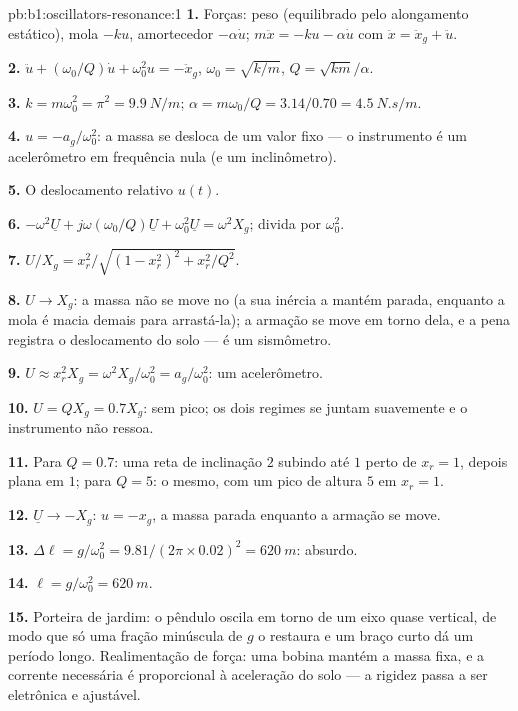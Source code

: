 \begin{solution}{pb:b1:oscillators-resonance:1}
\textbf{1.} Forças: peso (equilibrado pelo alongamento estático), mola
$-ku$, amortecedor $-\alpha\dot u$; $m\ddot x = -ku - \alpha\dot u$ com $\ddot x =
\ddot x_g + \ddot u$.

\textbf{2.} $\ddot u + (\omega_0/Q)\dot u + \omega_0^2u = -\ddot x_g$, $\omega_0 =
\sqrt{k/m}$, $Q = \sqrt{km}/\alpha$.

\textbf{3.} $k = m\omega_0^2 = \pi^2 = \qty{9.9}{N/m}$; $\alpha = m\omega_0/Q =
3.14/0.70 = \qty{4.5}{N.s/m}$.

\textbf{4.} $u = -a_g/\omega_0^2$: a massa se desloca de um valor fixo --- o
instrumento é um acelerômetro em frequência nula (e um inclinômetro).

\textbf{5.} O deslocamento relativo $u(t)$.

\textbf{6.} $-\omega^2\underline U + j\omega(\omega_0/Q)\underline U + \omega_0^2\underline U
= \omega^2X_g$; divida por $\omega_0^2$.

\textbf{7.} $U/X_g = x_r^2/\sqrt{(1 - x_r^2)^2 + x_r^2/Q^2}$.

\textbf{8.} $U \to X_g$: a massa não se move no 
(a sua inércia a mantém parada, enquanto a mola é macia demais para arrastá-la);
a armação se move em torno dela, e a pena registra o deslocamento do solo
--- é um sismômetro.

\textbf{9.} $U \approx x_r^2X_g = \omega^2X_g/\omega_0^2 = a_g/\omega_0^2$: um
acelerômetro.

\textbf{10.} $U = QX_g = 0.7X_g$: sem pico; os dois regimes se juntam suavemente
e o instrumento não ressoa.

\textbf{11.} Para $Q = 0.7$: uma reta de inclinação $2$ subindo até $1$ perto de
$x_r = 1$, depois plana em $1$; para $Q = 5$: o mesmo, com um pico de altura
$5$ em $x_r = 1$.

\textbf{12.} $\underline U \to -X_g$: $u = -x_g$, a massa parada enquanto a
armação se move.

\textbf{13.} $\Delta\ell = g/\omega_0^2 = 9.81/(2\pi \times 0.02)^2 = \qty{620}{m}$:
absurdo.

\textbf{14.} $\ell = g/\omega_0^2 = \qty{620}{m}$.

\textbf{15.} Porteira de jardim: o pêndulo oscila em torno de um eixo quase
vertical, de modo que só uma fração minúscula de $g$ o restaura e um braço curto dá
um período longo. Realimentação de força: uma bobina mantém a massa fixa, e a
corrente necessária é proporcional à aceleração do solo --- a
rigidez passa a ser eletrônica e ajustável.


\end{solution}
